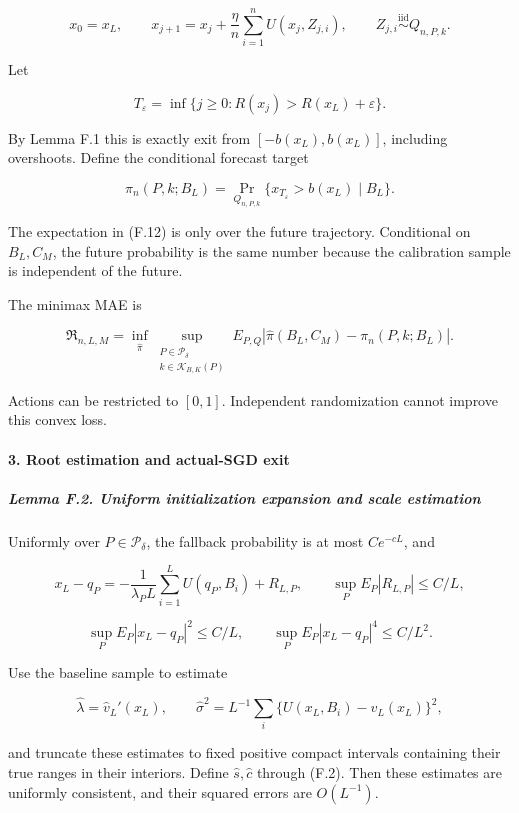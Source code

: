 \[
x_0=x_L,\qquad
x_{j+1}=x_j+\frac{\eta}{n}\sum_{i=1}^{n}U(x_j,Z_{j,i}),
\qquad Z_{j,i}\stackrel{\mathrm{iid}}{\sim}Q_{n,P,k}.
\tag{F.11}
\]

Let

\[
T_\varepsilon
=\inf\{j\ge0:R(x_j)>R(x_L)+\varepsilon\}.
\]

By Lemma F.1 this is exactly exit from \([-b(x_L),b(x_L)]\), including
overshoots. Define the conditional forecast target

\[
\pi_n(P,k;B_L)
=\Pr_{Q_{n,P,k}}\{x_{T_\varepsilon}>b(x_L)\mid B_L\}.
\tag{F.12}
\]

The expectation in (F.12) is only over the future trajectory.
Conditional on \(B_L,C_M\), the future probability is the same number
because the calibration sample is independent of the future.

The minimax MAE is

\[
\mathfrak R_{n,L,M}
=\inf_{\widehat\pi}
 \sup_{\substack{P\in\mathcal P_\delta\\k\in\mathcal K_{B,K}(P)}}
 E_{P,Q}\left|\widehat\pi(B_L,C_M)-\pi_n(P,k;B_L)\right|.
\tag{F.13}
\]

Actions can be restricted to \([0,1]\). Independent randomization cannot
improve this convex loss.

\paragraph{3. Root estimation and actual-SGD
exit}\label{root-estimation-and-actual-sgd-exit}

\subparagraph{Lemma F.2. Uniform initialization expansion and scale
estimation}\label{lemma-f.2.-uniform-initialization-expansion-and-scale-estimation}

Uniformly over \(P\in\mathcal P_\delta\), the fallback probability is at
most \(C e^{-cL}\), and

\[
x_L-q_P
=-\frac1{\lambda_PL}\sum_{i=1}^{L}U(q_P,B_i)+R_{L,P},
\qquad
\sup_P E_P|R_{L,P}|\le C/L,
\tag{F.14}
\]

\[
\sup_P E_P|x_L-q_P|^2\le C/L,\qquad
\sup_P E_P|x_L-q_P|^4\le C/L^2.
\tag{F.15}
\]

Use the baseline sample to estimate

\[
\widehat\lambda=\widehat v_L'(x_L),\qquad
\widehat\sigma^2=L^{-1}\sum_i
\{U(x_L,B_i)-\widehat v_L(x_L)\}^2,
\]

and truncate these estimates to fixed positive compact intervals
containing their true ranges in their interiors. Define
\(\widehat s,\widehat c\) through (F.2). Then these estimates are
uniformly consistent, and their squared errors are \(O(L^{-1})\).

